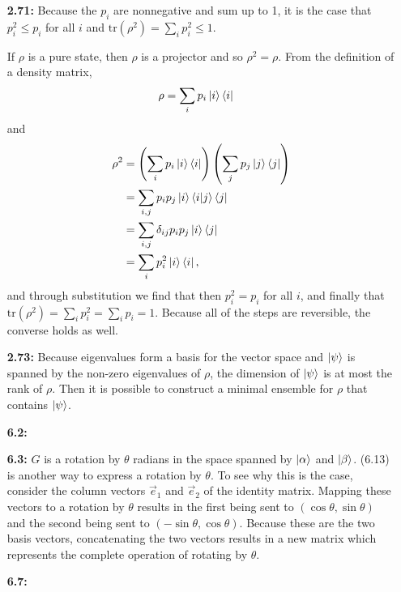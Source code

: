 \documentclass[a4paper,12pt]{article}
\begin{document}
\begin{enumerate}
    \item[\textbf{2.71:}]
        Because the $p_i$ are nonnegative and sum up to 1, it is the case that $p_i^2 \leq p_i$ for all $i$ and $\text{tr}(\rho^2) = \sum_i p_i^2 \leq 1$. \par
        If $\rho$ is a pure state, then $\rho$ is a projector and so $\rho^2 = \rho$. From the definition of a density matrix,
        \begin{align*}
            \rho &= \sum_i p_i \ket{i} \bra{i}
        \end{align*}
        and
        \begin{align*}
            \rho^2 &= \left( \sum_i p_i \ket{i} \bra{i} \right) \left( \sum_j p_j \ket{j} \bra{j} \right) \\
            &= \sum_{i, j} p_i p_j \ket{i} \braket{i}{j} \bra{j} \\
            &= \sum_{i, j} \delta_{ij} p_i p_j \ket{i} \bra{j} \\
            &= \sum_i p_i^2 \ket{i} \bra{i},
        \end{align*}
        and through substitution we find that then $p_i^2 = p_i$ for all $i$, and finally that $\text{tr}(\rho^2) = \sum_i p_i^2 = \sum_i p_i = 1$. Because all of the steps are reversible, the converse holds as well.

    \item[\textbf{2.73:}]
        Because eigenvalues form a basis for the vector space and $\ket{\psi}$ is spanned by the non-zero eigenvalues of $\rho$, the dimension of $\ket{\psi}$ is at most the rank of $\rho$. Then it is possible to construct a minimal ensemble for $\rho$ that contains $\ket{\psi}$.

    \item[\textbf{6.2:}]

    \item[\textbf{6.3:}]
        $G$ is a rotation by $\theta$ radians in the space spanned by $\ket{\alpha}$ and $\ket{\beta}$. (6.13) is another way to express a rotation by $\theta$. To see why this is the case, consider the column vectors $\vec{e}_1$ and $\vec{e}_2$ of the identity matrix. Mapping these vectors to a rotation by $\theta$ results in the first being sent to $(\cos\theta, \sin\theta)$ and the second being sent to $(-\sin\theta, \cos\theta)$. Because these are the two basis vectors, concatenating the two vectors results in a new matrix which represents the complete operation of rotating by $\theta$.

    \item[\textbf{6.7:}]


\end{enumerate}
\end{document}
